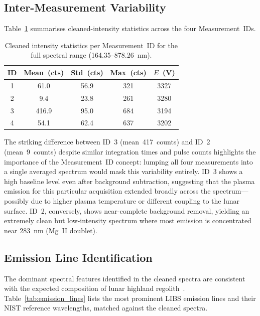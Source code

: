 \documentclass[a4paper,twocolumn,10pt]{article}
\begin{document}
\subsection{Inter-Measurement Variability}

Table~\ref{tab:measurement_stats} summarises cleaned-intensity
statistics across the four Measurement~IDs.

\begin{table}[htbp]
\centering
\caption{Cleaned intensity statistics per Measurement~ID for the
  full spectral range (164.35--878.26~nm).}
\label{tab:measurement_stats}
\begin{tabularx}{\columnwidth}{c c c c c}
\toprule
\textbf{ID} & \textbf{Mean~(cts)} & \textbf{Std~(cts)} &
  \textbf{Max~(cts)} & \textbf{$E$~(V)} \\
\midrule
1 & 61.0  & 56.9  & 321  & 3327 \\
2 & 9.4   & 23.8  & 261  & 3280 \\
3 & 416.9 & 95.0  & 684  & 3194 \\
4 & 54.1  & 62.4  & 637  & 3202 \\
\bottomrule
\end{tabularx}
\end{table}

The striking difference between ID~3 (mean~417~counts) and ID~2
(mean~9~counts) despite similar integration times and pulse counts
highlights the importance of the Measurement~ID concept: lumping all
four measurements into a single averaged spectrum would mask this
variability entirely.  ID~3 shows a high baseline level even after
background subtraction, suggesting that the plasma emission for this
particular acquisition extended broadly across the spectrum---possibly
due to higher plasma temperature or different coupling to the lunar
surface.  ID~2, conversely, shows near-complete background removal,
yielding an extremely clean but low-intensity spectrum where most
emission is concentrated near 283~nm (Mg~II doublet).

\subsection{Emission Line Identification}

The dominant spectral features identified in the cleaned spectra are
consistent with the expected composition of lunar highland
regolith~\cite{Sridhar2025,ISROCh3}.  Table~\ref{tab:emission_lines}
lists the most prominent LIBS emission lines and their NIST reference
wavelengths, matched against the cleaned spectra.
\end{document}
